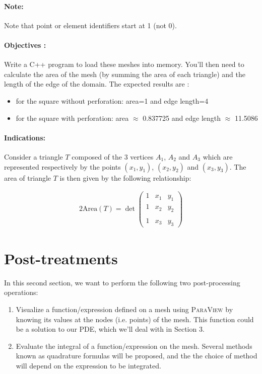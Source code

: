 \documentclass[english,10pt,a4paper]{article}
\begin{document}
\paragraph{Note:} Note that point or element identifiers start at 1 (not 0).

\paragraph{Objectives :}
Write a C++ program to load these meshes into memory. You'll then need to calculate the area of the mesh (by summing the area of each triangle) and the length of the edge of the domain.
The expected results are :
\begin{itemize}
\item for the square without perforation: area=1 and edge length=4
\item for the square with perforation: area $\approx$ 0.837725 and edge length $\approx$ 11.5086
\end{itemize}


\paragraph{Indications:}
Consider a triangle $T$ composed of the 3 vertices $A_1$, $A_2$ and $A_3$ which are represented respectively by the points $(x_1,y_1)$, $(x_2,y_2)$ and $(x_3,y_3)$.
The area of triangle $T$ is then given by the following relationship:

\begin{eqnarray*}
2 \mathrm{Area}(T) = \det \left(
  \begin{matrix}
    1 & x_1 & y_1 \\
    1 & x_2 & y_2 \\\\
    1 & x_3 & y_3
  \end{matrix}
  \right)
\end{eqnarray*}




\section{Post-treatments}

In this second section, we want to perform the following two post-processing operations:
\begin{enumerate}
\item Visualize a function/expression defined on a mesh using \textsc{ParaView} by knowing its values at the nodes (i.e. points) of the mesh.
  This function could be a solution to our PDE, which we'll deal with in Section 3.
\item Evaluate the integral of a function/expression on the mesh. Several methods known as quadrature formulas will be proposed, and the
  the choice of method will depend on the expression to be integrated.
\end{enumerate}
\end{document}
